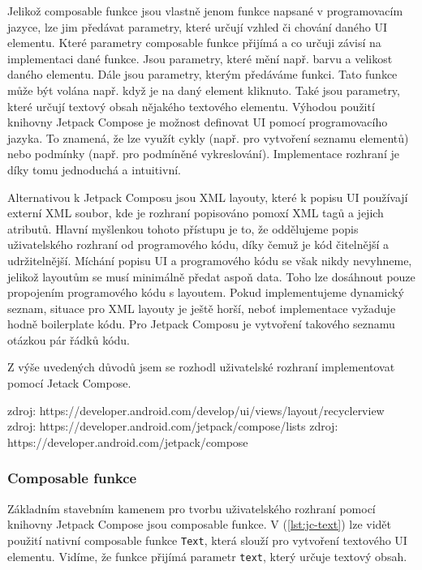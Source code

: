 Jelikož composable funkce jsou vlastně jenom funkce napsané v programovacím jazyce, lze jim předávat parametry, které určují vzhled či chování daného UI elementu. Které parametry composable funkce přijímá a co určuji závisí na implementaci dané funkce. Jsou parametry, které mění např. barvu a velikost daného elementu. Dále jsou parametry, kterým předáváme funkci. Tato funkce může být volána např. když je na daný element kliknuto. Také jsou parametry, které určují textový obsah nějakého textového elementu. Výhodou použití knihovny Jetpack Compose je možnost definovat UI pomocí programovacího jazyka. To znamená, že lze využít cykly (např. pro vytvoření seznamu elementů) nebo podmínky (např. pro podmíněné vykreslování). Implementace rozhraní je díky tomu jednoduchá a intuitivní.

Alternativou k Jetpack Composu jsou XML layouty, které k popisu UI používají externí XML soubor, kde je rozhraní popisováno pomoxí XML tagů a jejich atributů. Hlavní myšlenkou tohoto přístupu je to, že oddělujeme popis uživatelského rozhraní od programového kódu, díky čemuž je kód čitelnější a udržitelnější. Míchání popisu UI a programového kódu se však nikdy nevyhneme, jelikož layoutům se musí minimálně předat aspoň data. Toho lze dosáhnout pouze propojením programového kódu s layoutem. Pokud implementujeme dynamický seznam, situace pro XML layouty je ještě horší, neboť implementace vyžaduje hodně boilerplate kódu. Pro Jetpack Composu je vytvoření takového seznamu otázkou pár řádků kódu.

Z výše uvedených důvodů jsem se rozhodl uživatelské rozhraní implementovat pomocí Jetack Compose.

\vspace*{10px}
\noindent zdroj: https://developer.android.com/develop/ui/views/layout/recyclerview
\noindent zdroj: https://developer.android.com/jetpack/compose/lists
zdroj: https://developer.android.com/jetpack/compose

\vspace*{10px}

\subsubsection*{Composable funkce}
Základním stavebním kamenem pro tvorbu uživatelského rozhraní pomocí knihovny Jetpack Compose jsou composable funkce. V (\ref{lst:jc-text}) lze vidět použití nativní composable funkce \lstinline|Text|, která slouží pro vytvoření textového UI elementu. Vidíme, že funkce přijímá parametr \lstinline|text|, který určuje textový obsah.

